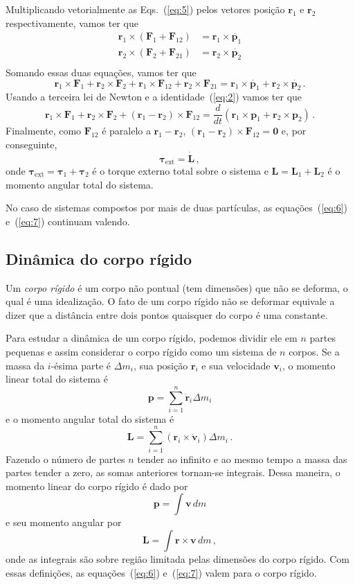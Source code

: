 \documentclass[twocolumn=on,DIV=calc]{scrartcl}
\begin{document}
Multiplicando vetorialmente as Eqs.~(\ref{eq:5}) pelos vetores posição
$\mathbf{r}_1$ e $\mathbf{r}_2$ respectivamente, vamos ter que
\begin{equation*}
  \begin{split}
    \mathbf{r}_1\times(\mathbf{F}_1+\mathbf{F}_{12})&=\mathbf{r}_1\times\dot{\mathbf{p}_1}\\
    \mathbf{r}_2\times(\mathbf{F}_2+\mathbf{F}_{21})&=\mathbf{r}_2\times\dot{\mathbf{p}_2}\\
  \end{split}
\end{equation*}
Somando essas duas equações, vamos ter que
$$\mathbf{r}_1\times\mathbf{F}_1+\mathbf{r}_2\times\mathbf{F}_2+\mathbf{r}_1\times\mathbf{F}_{12}+\mathbf{r}_2\times\mathbf{F}_{21}=\mathbf{r}_1\times\dot{\mathbf{p}_1}+\mathbf{r}_2\times\dot{\mathbf{p}_2}\,.$$
Usando a terceira lei de Newton e a identidade~(\ref{eq:2}) vamos ter
que
$$\mathbf{r}_1\times\mathbf{F}_1+\mathbf{r}_2\times\mathbf{F}_2+(\mathbf{r}_1-\mathbf{r}_2)\times\mathbf{F}_{12}=\frac{d}{dt}(\mathbf{r}_1\times\mathbf{p}_1+\mathbf{r}_2\times\mathbf{p}_2)\,.$$
Finalmente, como $\mathbf{F}_{12}$ é paralelo a
$\mathbf{r}_1-\mathbf{r}_2$,
$(\mathbf{r}_1-\mathbf{r}_2)\times\mathbf{F}_{12}=\mathbf{0}$ e, por
conseguinte,
\begin{equation}
  \label{eq:7}
  \boldsymbol{\tau}_{\mathrm{ext}}=\dot{\mathbf{L}}\,,
\end{equation}
onde
$\boldsymbol{\tau}_{\mathrm{ext}}=\boldsymbol{\tau}_1+\boldsymbol{\tau}_2$
é o torque externo total sobre o sistema e
$\mathbf{L}=\mathbf{L}_1+\mathbf{L}_2$ é o momento angular total do
sistema.

No caso de sistemas compostos por mais de duas partículas, as
equações~(\ref{eq:6}) e~(\ref{eq:7}) continuam valendo.

\subsection{Dinâmica do corpo rígido}

Um \textit{corpo rígido} é um corpo não pontual (tem dimensões) que
não se deforma, o qual é uma idealização. O fato de um corpo rígido
não se deformar equivale a dizer que a distância entre dois pontos
quaisquer do corpo é uma constante.

Para estudar a dinâmica de um corpo rígido, podemos dividir ele em $n$
partes pequenas e assim considerar o corpo rígido como um sistema de
$n$ corpos. Se a massa da $i$-ésima parte é $\Delta m_i$, sua posição
$\mathbf{r}_i$ e sua velocidade $\mathbf{v}_i$, o momento linear total
do sistema é
$$\mathbf{p}=\sum_{i=1}^n\dot{\mathbf{r}}_i\Delta m_i$$
e o momento angular total do sistema é
$$\mathbf{L}=\sum_{i=1}^n(\mathbf{r}_i\times\dot{\mathbf{v}}_i)\Delta m_i\,.$$
Fazendo o número de partes $n$ tender ao infinito e ao mesmo tempo a
massa das partes tender a zero, as somas anteriores tornam-se
integrais. Dessa maneira, o momento linear do corpo rígido é dado por
$$\mathbf{p}=\int \mathbf{v}\,dm$$
e seu momento angular por
$$\mathbf{L}=\int \mathbf{r}\times\mathbf{v}\,dm\,,$$
onde as integrais são sobre região limitada pelas dimensões do corpo
rígido. Com essas definições, as equações~(\ref{eq:6}) e~(\ref{eq:7})
valem para o corpo rígido.
\end{document}
